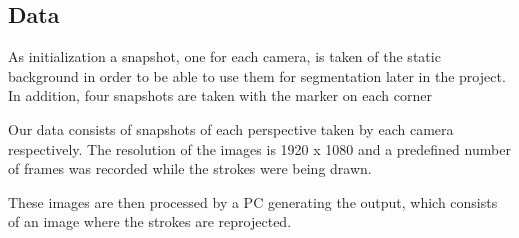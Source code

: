 \documentclass[a4paper,12pt]{article}
\begin{document}
\subsection*{Data}
As initialization a snapshot, one for each camera, is taken of the static background in order to be able to use them for segmentation later in the project. In addition, four snapshots are taken with the marker on each corner

Our data consists of snapshots of each perspective taken by each camera respectively. The resolution of the images is 1920 x 1080 and a predefined number of frames was recorded while the strokes were being drawn. 

These images are then processed by a PC generating the output, which consists of an image where the strokes are reprojected.




\end{document}
